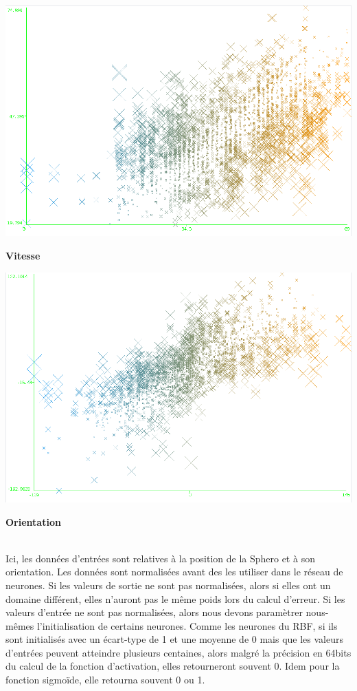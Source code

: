 \begin{minipage}[c]{\mpwekawidth}
 \includegraphics[width=\textwidth]{../figures/speed121314N1500H20.png}
 \begin{center}
  \textbf{Vitesse}
 \end{center}
\end{minipage}
\begin{minipage}[c]{\mpwekawidth}
 \includegraphics[width=\textwidth]{../figures/121314N1500H20.png}
 \begin{center}
  \textbf{Orientation}
 \end{center}
\end{minipage}
\\

Ici, les données d'entrées sont relatives à la position de la Sphero et à son orientation.
Les données sont normalisées avant des les utiliser dans le réseau de neurones.
Si les valeurs de sortie ne sont pas normalisées, alors si elles ont un domaine différent, elles n'auront pas le même poids lors du calcul d'erreur.
Si les valeurs d'entrée ne sont pas normalisées, alors nous devons paramètrer nous-mêmes l'initialisation de certains neurones.
Comme les neurones du RBF, si ils sont initialisés avec un écart-type de 1 et une moyenne de 0 mais que les valeurs d'entrées peuvent atteindre plusieurs centaines,
alors malgré la précision en 64bits du calcul de la fonction d'activation, elles retourneront souvent 0.
Idem pour la fonction sigmoïde, elle retourna souvent 0 ou 1.


